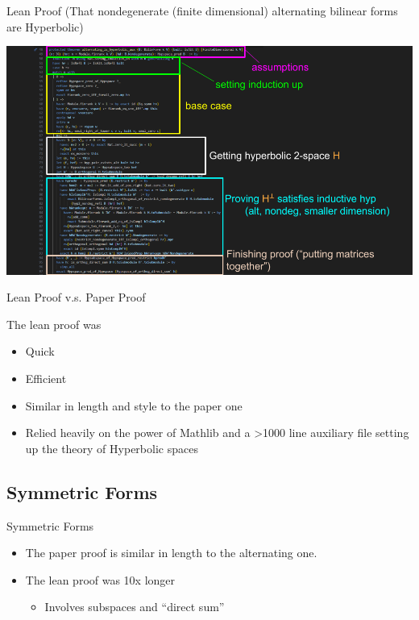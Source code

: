 \documentclass[svgnames]{beamer}
\begin{document}
\begin{frame}[label={sec_proof_comparison},fragile]{Lean Proof {\tiny(That nondegenerate (finite dimensional) alternating bilinear forms are Hyperbolic)}}

\includegraphics[width=1\linewidth]{lean alternating.png}
\end{frame}


\begin{frame}{Lean Proof v.s. Paper Proof}


The lean proof was
\pause
\begin{itemize}[<+->]
    \item Quick
    \item Efficient
    \item Similar in length and style to the paper one
    \item Relied heavily on the power of Mathlib and a >1000 line auxiliary file setting up the theory of Hyperbolic spaces
\end{itemize}
\end{frame}

\subsection{Symmetric Forms}
\begin{frame}{Symmetric Forms}
\begin{itemize}[<+->]
\begin{block}{Theorem}
Every nondegenerate (finite dimensional, field characteristic not $2$) symmetric bilinear form is the direct sum of a Hyperbolic form and a definite (anisotropic) form. 
\end{block}
\item The paper proof is similar in length to the alternating one. 
\item The lean proof was 10x longer
\begin{itemize}[<+->]
    \item Involves subspaces and ``direct sum''
\end{itemize}
\end{itemize}
\end{frame}
\end{document}
